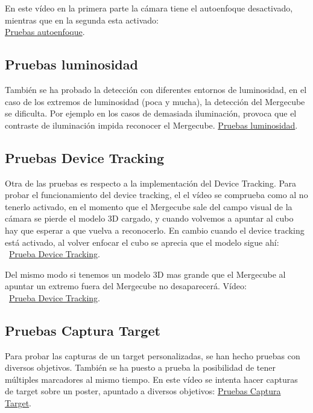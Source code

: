 En este vídeo en la primera parte la cámara tiene el autoenfoque desactivado, mientras que en la segunda esta activado:\\ \href{https://www.youtube.com/watch?v=FsTertkK1gY}{Pruebas autoenfoque}.



\subsection{Pruebas luminosidad}
También se ha probado la detección con diferentes entornos de luminosidad, en el caso de los extremos de luminosidad (poca y mucha), la detección del Mergecube se dificulta. Por ejemplo en los casos de demasiada iluminación, provoca que el contraste de iluminación impida reconocer el Mergecube. 
\href{https://www.youtube.com/watch?v=0kfcTpOKaV8}{Pruebas luminosidad}.

\subsection{Pruebas Device Tracking}
Otra de las pruebas es respecto a la implementación del Device Tracking. Para probar el funcionamiento del device tracking, el el vídeo se comprueba como al no tenerlo activado, en el momento que el Mergecube sale del campo visual de la cámara se pierde el modelo 3D cargado, y cuando volvemos a apuntar al cubo hay que esperar a que vuelva a reconocerlo. En cambio cuando el device tracking está activado, al volver enfocar el cubo se aprecia que el modelo sigue ahí:\\~\href{https://www.youtube.com/watch?v=5szopM7FkAQ}{Prueba Device Tracking}.

Del mismo modo si tenemos un modelo 3D mas grande que el Mergecube al apuntar un extremo fuera del Mergecube no desaparecerá. Vídeo:\\~\href{https://www.youtube.com/watch?v=zBC3y8zizVI}{Prueba Device Tracking}.

\subsection{Pruebas Captura Target}
Para probar las capturas de un target personalizadas, se han hecho pruebas con diversos objetivos. También se ha puesto a prueba la posibilidad de tener múltiples marcadores al mismo tiempo. En este vídeo se intenta hacer capturas de target sobre un poster, apuntado a diversos objetivos: \href{https://www.youtube.com/watch?v=k_bbJS2Hb1w}{Pruebas Captura Target}.	


